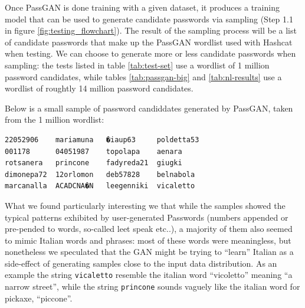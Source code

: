 Once PassGAN is done training with a given dataset, it produces a training model that can be used to generate candidate passwords via sampling (Step 1.1 in figure \ref{fig:testing_flowchart}). The result of the sampling process will be a list of candidate passwords that make up the PassGAN wordlist used with Hashcat when testing. We can choose to generate more or less candidate passwords when sampling: the tests listed in table \ref{tab:test-set} use a wordlist of 1 million password candidates, while tables \ref{tab:passgan-big} and \ref{tab:nl-results} use a wordlist of roughtly 14 million password candidates.




Below is a small sample of password candiddates generated by PassGAN, taken from the 1 million wordlist: %
\begin{verbatim}
22052906    mariamuna   �iaup63     poldetta53
001178      04051987    topolapa    aenara
rotsanera   princone    fadyreda21  giugki
dimonepa72  12orlomon   deb57828    belnabola
marcanalla  ACADCNA�N   leegenniki  vicaletto
\end{verbatim}

What we found particularly interesting we that while the samples showed the typical patterns exhibited by user-generated Passwords (numbers appended or pre-pended to words, so-called leet speak etc..), a majority of them also seemed to mimic Italian words and phrases: most of these words were meaningless, but nonetheless we speculated that the GAN might be trying to \enquote{learn} Italian as a side-effect of generating samples close to the input data distribution.
As an example the string \texttt{vicaletto} resemble the italian word \enquote{vicoletto} meaning \enquote{a narrow street}, while the string \texttt{princone} sounds vaguely like the italian word for pickaxe, \enquote{piccone}. 

